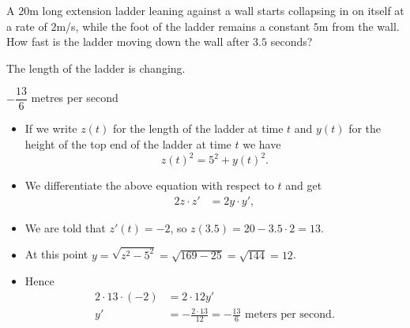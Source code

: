 \begin{question}[2015Q]\label{s3.2Pythagoruslast}
A $20$m long extension ladder leaning against a wall starts collapsing in on itself at a
rate of $2$m/s, while the foot of the ladder remains a constant $5$m from the wall.
How fast is the ladder moving down the wall after $3.5$ seconds?
\end{question}
\begin{hint} The length of the ladder is changing.
\end{hint}
\begin{answer}
$-\dfrac{13}{6}$ metres per second
\end{answer}
\begin{solution}
\begin{itemize}
 \item
    If we write $z(t)$ for the length of the ladder at time $t$ and $y(t)$ for the height of the top end of the ladder at time $t$ we have
    \[
        z(t)^2 = 5^2 + y(t)^2.
    \]
\item We differentiate the above equation with respect to $t$ and get
\begin{align*}
2z \cdot z' &= 2y \cdot y',
\end{align*}
\item We are told that $z'(t)=-2$, so $z(3.5)=20-3.5\cdot2 = 13$.
\item At this point $y = \sqrt{z^2-5^2} = \sqrt{169-25} = \sqrt{144} = 12$.
\item Hence
\begin{align*}
  2\cdot 13 \cdot (-2) &= 2 \cdot 12 y' \\
  y' &= -\frac{2\cdot 13}{12} = -\frac{13}{6} \text{ meters per second}.
\end{align*}
\end{itemize}
\end{solution}





